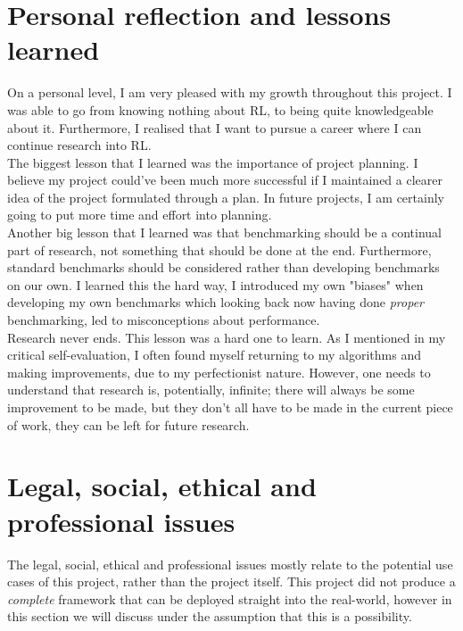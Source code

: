 \begin{appendices}
\section{Personal reflection and lessons learned}
On a personal level, I am very pleased with my growth throughout this project. I was able to go from knowing nothing about RL, to being quite knowledgeable about it. Furthermore, I realised that I want to pursue a career where I can continue research into RL.
\\The biggest lesson that I learned was the importance of project planning. I believe my project could've been much more successful if I maintained a clearer idea of the project formulated through a plan. In future projects, I am certainly going to put more time and effort into planning.
\\Another big lesson that I learned was that benchmarking should be a continual part of research, not something that should be done at the end. Furthermore, standard benchmarks should be considered rather than developing benchmarks on our own. I learned this the hard way, I introduced my own "biases" when developing my own benchmarks which looking back now having done \textit{proper} benchmarking, led to misconceptions about performance.
\\Research never ends. This lesson was a hard one to learn. As I mentioned in my critical self-evaluation, I often found myself returning to my algorithms and making improvements, due to my perfectionist nature. However, one needs to understand that research is, potentially, infinite; there will always be some improvement to be made, but they don't all have to be made in the current piece of work, they can be left for future research.

\section{Legal, social, ethical and professional issues}
The legal, social, ethical and professional issues mostly relate to the potential use cases of this project, rather than the project itself. This project did not produce a \textit{complete} framework that can be deployed straight into the real-world, however in this section we will discuss under the assumption that this is a possibility.

\end{appendices}
